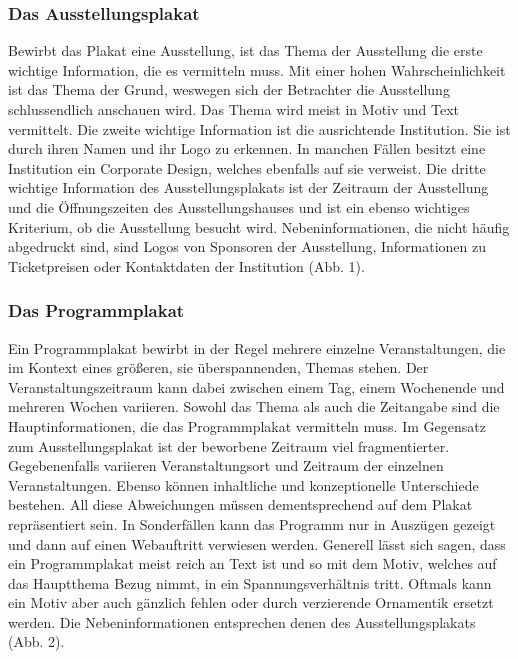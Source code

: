\documentclass[a4paper,12pt,ngerman]{article}
\begin{document}
\subsubsection{Das Ausstellungsplakat}
Bewirbt das Plakat eine Ausstellung, ist das Thema der Ausstellung die erste wichtige Information, die es vermitteln muss. Mit einer hohen Wahrscheinlichkeit ist das Thema der Grund, weswegen sich der Betrachter die Ausstellung schlussendlich anschauen wird. Das Thema wird meist in Motiv und Text vermittelt. Die zweite wichtige Information ist die ausrichtende Institution. Sie ist durch ihren Namen und ihr Logo zu erkennen. In manchen Fällen besitzt eine Institution ein Corporate Design, welches ebenfalls auf sie verweist. Die dritte wichtige Information des Ausstellungsplakats ist der Zeitraum der Ausstellung und die Öffnungszeiten des Ausstellungshauses und ist ein ebenso wichtiges Kriterium, ob die Ausstellung besucht wird. Nebeninformationen, die nicht häufig abgedruckt sind, sind Logos von Sponsoren der Ausstellung, Informationen zu Ticketpreisen oder Kontaktdaten der Institution (Abb. 1). \\

\subsubsection{Das Programmplakat}
Ein Programmplakat bewirbt in der Regel mehrere einzelne Veranstaltungen, die im Kontext eines größeren, sie überspannenden, Themas stehen. Der Veranstaltungszeitraum kann dabei zwischen einem Tag, einem Wochenende und mehreren Wochen variieren. Sowohl das Thema als auch die Zeitangabe sind die Hauptinformationen, die das Programmplakat vermitteln muss. Im Gegensatz zum Ausstellungsplakat ist der beworbene Zeitraum viel fragmentierter. Gegebenenfalls variieren Veranstaltungsort und Zeitraum der einzelnen Veranstaltungen. Ebenso können inhaltliche und konzeptionelle Unterschiede bestehen. All diese Abweichungen müssen dementsprechend auf dem Plakat repräsentiert sein. In Sonderfällen kann das Programm nur in Auszügen gezeigt und dann auf einen Webauftritt verwiesen werden. Generell lässt sich sagen, dass ein Programmplakat meist reich an Text ist und so mit dem Motiv, welches auf das Hauptthema Bezug nimmt, in ein Spannungsverhältnis tritt. Oftmals kann ein Motiv aber auch gänzlich fehlen oder durch verzierende Ornamentik ersetzt werden. Die Nebeninformationen entsprechen denen des Ausstellungsplakats (Abb. 2). \\
\end{document}
